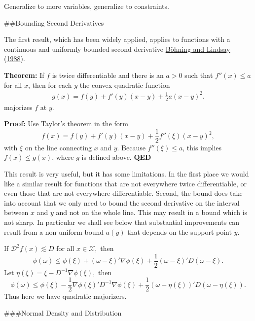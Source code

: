 \documentclass[
  12pt,
]{book}
\begin{document}
Generalize to more variables, generalize to constraints.

\#\#Bounding Second Derivatives

The first result, which has been widely applied, applies to functions with a continuous and uniformly bounded second derivative \protect\hyperlink{ref-boehning_lindsay_88}{Böhning and Lindsay} (\protect\hyperlink{ref-boehning_lindsay_88}{1988}).

\textbf{Theorem:}
If \(f\) is twice differentiable and there is an \(a>0\) such that \(f''(x)\leq a\) for
all \(x\), then for each \(y\) the convex quadratic function
\begin{eqnarray*}
g(x)=f(y)+f'(y)(x-y)+\frac{1}{2}a(x-y)^2.
\end{eqnarray*}
majorizes \(f\) at \(y\).

\textbf{Proof:}
Use Taylor's theorem in the form
\[
f(x)=f(y)+f'(y)(x-y)+
\frac{1}{2}f''(\xi)(x-y)^2,
\]
with \(\xi\) on the line connecting \(x\) and \(y\).
Because \(f''(\xi)\leq a\), this implies \(f(x)\leq g(x)\), where \(g\) is defined above.
\textbf{QED}

This result is very useful, but it has some limitations. In the first place we would like a
similar result for functions that are not everywhere twice differentiable, or even those that are not everywhere differentiable. Second, the bound does take into account that we only need to bound the second derivative on the interval between \(x\) and \(y\) and not on the whole line. This may result in a bound which is not sharp. In particular we shall see below that substantial improvements can result from a non-uniform bound \(a(y)\) that depends on the support point \(y\).

If \(\mathcal{D}^2f(x)\lesssim D\) for all \(x\in\mathcal{X},\) then
\[
\phi(\omega)\leq\phi(\xi)+(\omega-\xi)'\nabla\phi(\xi)+
\frac{1}{2}(\omega-\xi)'D(\omega-\xi).
\]
Let \(\eta(\xi)=\xi-D^{-1}\nabla\phi(\xi),\) then
\[
\phi(\omega)\leq\phi(\xi)-\frac{1}{2}\nabla\phi(\xi)'D^{-1}\nabla\phi(\xi)+
\frac{1}{2}(\omega-\eta(\xi))'D(\omega-\eta(\xi)).
\]
Thus here we have quadratic majorizers.

\#\#\#Normal Density and Distribution
\end{document}
